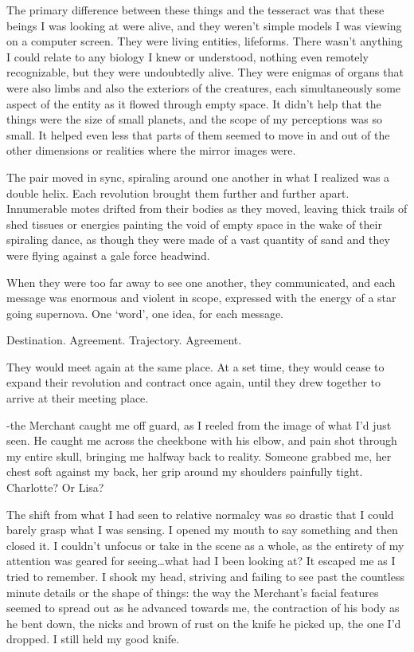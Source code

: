 The primary difference between these things and the tesseract was that these beings I was looking at were alive, and they weren't simple models I was viewing on a computer screen.  They were living entities, lifeforms.  There wasn't anything I could relate to any biology I knew or understood, nothing even remotely recognizable, but they were undoubtedly alive.  They were enigmas of organs that were also limbs and also the exteriors of the creatures, each simultaneously some aspect of the entity as it flowed through empty space.  It didn't help that the things were the size of small planets, and the scope of my perceptions was so small.  It helped even less that parts of them seemed to move in and out of the other dimensions or realities where the mirror images were.



The pair moved in sync, spiraling around one another in what I realized was a double helix.  Each revolution brought them further and further apart.  Innumerable motes drifted from their bodies as they moved, leaving thick trails of shed tissues or energies painting the void of empty space in the wake of their spiraling dance, as though they were made of a vast quantity of sand and they were flying against a gale force headwind.



When they were too far away to see one another, they communicated, and each message was enormous and violent in scope, expressed with the energy of a star going supernova.  One `word', one idea, for each message.



Destination.  Agreement.  Trajectory.  Agreement.



They would meet again at the same place.  At a set time, they would cease to expand their revolution and contract once again, until they drew together to arrive at their meeting place.



-the Merchant caught me off guard, as I reeled from the image of what I'd just seen.  He caught me across the cheekbone with his elbow, and pain shot through my entire skull, bringing me halfway back to reality.  Someone grabbed me, her chest soft against my back, her grip around my shoulders painfully tight.  Charlotte?  Or Lisa?



The shift from what I had seen to relative normalcy was so drastic that I could barely grasp what I was sensing.  I opened my mouth to say something and then closed it.  I couldn't unfocus or take in the scene as a whole, as the entirety of my attention was geared for seeing\ldots what had I been looking at?  It escaped me as I tried to remember.  I shook my head, striving and failing to see past the countless minute details or the shape of things: the way the Merchant's facial features seemed to spread out as he advanced towards me, the contraction of his body as he bent down, the nicks and brown of rust on the knife he picked up, the one I'd dropped.  I still held my good knife.



